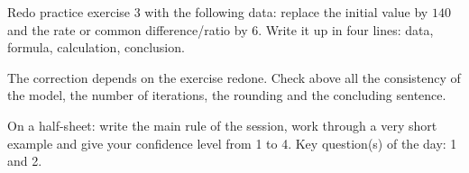 
    \begin{homework}Redo practice exercise 3 with the following data: replace the initial value by $140$ and the rate or common difference/ratio by $6$. Write it up in four lines: data, formula, calculation, conclusion.\end{homework}
    \begin{solution}The correction depends on the exercise redone. Check above all the consistency of the model, the number of iterations, the rounding and the concluding sentence.\end{solution}

    \begin{exitticket}[3 minutes]On a half-sheet: write the main rule of the session, work through a very short example and give your confidence level from 1 to 4. Key question(s) of the day: 1 and 2.\end{exitticket}

